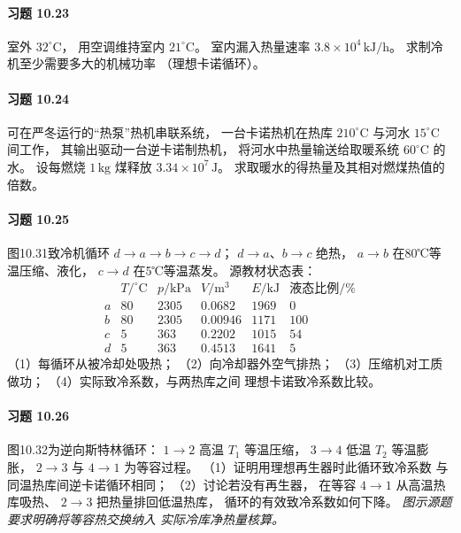 \paragraph{习题 10.23}
室外 \(32^\circ\mathrm C\)，
用空调维持室内 \(21^\circ\mathrm C\)。
室内漏入热量速率
\(3.8\times10^4\,\mathrm{kJ/h}\)。
求制冷机至少需要多大的机械功率
（理想卡诺循环）。

\paragraph{习题 10.24}
可在严冬运行的“热泵”热机串联系统，
一台卡诺热机在热库 \(210^\circ\mathrm C\)
与河水 \(15^\circ\mathrm C\) 间工作，
其输出驱动一台逆卡诺制热机，
将河水中热量输送给取暖系统
\(60^\circ\mathrm C\) 的水。
设每燃烧 \(1\,\mathrm{kg}\) 煤释放
\(3.34\times10^7\,\mathrm J\)。
求取暖水的得热量及其相对燃煤热值的倍数。

\paragraph{习题 10.25}
图10.31致冷机循环
\(d\to a\to b\to c\to d\)；
\(d\to a\)、\(b\to c\) 绝热，
\(a\to b\) 在80℃等温压缩、液化，
\(c\to d\) 在5℃等温蒸发。
源教材状态表：
\[
\begin{array}{c|rrrrr}
 & T/^\circ\mathrm C&p/\mathrm{kPa}&V/\mathrm{m^3}&
 E/\mathrm{kJ}&\text{液态比例}/\%\\\hline
a&80&2305&0.0682&1969&0\\
b&80&2305&0.00946&1171&100\\
c&5&363&0.2202&1015&54\\
d&5&363&0.4513&1641&5
\end{array}
\]
（1）每循环从被冷却处吸热；
（2）向冷却器外空气排热；
（3）压缩机对工质做功；
（4）实际致冷系数，与两热库之间
理想卡诺致冷系数比较。

\paragraph{习题 10.26}
图10.32为逆向斯特林循环：
\(1\to2\) 高温 \(T_1\) 等温压缩，
\(3\to4\) 低温 \(T_2\) 等温膨胀，
\(2\to3\) 与 \(4\to1\) 为等容过程。
（1）证明用理想再生器时此循环致冷系数
与同温热库间逆卡诺循环相同；
（2）讨论若没有再生器，
在等容 \(4\to1\) 从高温热库吸热、
\(2\to3\) 把热量排回低温热库，
循环的有效致冷系数如何下降。
\textit{图示源题要求明确将等容热交换纳入
实际冷库净热量核算。}
